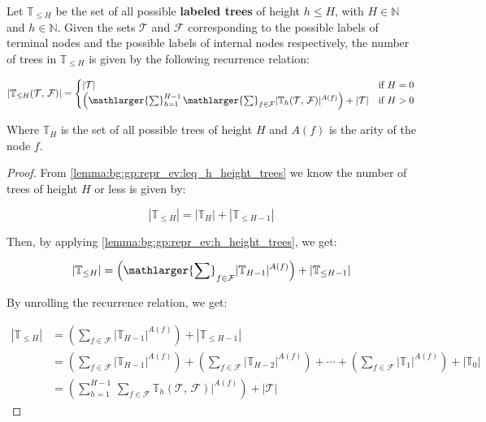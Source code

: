   \begin{theorem}
  \label{thm:bg:gp:repr_ev:leq_h_height_trees}
    Let \(\mathbb{T}_{\leq H}\) be the set of all possible \textbf{labeled 
    trees} of height \(h \leq H\), with \(H \in \mathbb{N}\) and \(h \in 
    \mathbb{N}\).
    Given the sets \(\mathcal{T}\) and \(\mathcal{F}\) corresponding to the
    possible labels of terminal nodes and the possible labels of internal nodes 
    respectively, the number of trees in \(\mathbb{T}_{\leq H}\) is given by the
    following recurrence relation:

    \begin{equation}
      |\mathbb{T}_{\leq H}(\mathcal{T},\, \mathcal{F})| = \begin{cases}
        |\mathcal{T}| 
          & \text{if } H = 0 \\
        \left(\mathlarger{\sum}_{h = 1}^{H - 1}\,
          \mathlarger{\sum}_{f \in \mathcal{F}} 
            |\mathbb{T}_{h}(\mathcal{T},\, \mathcal{F})|^{A(f)}\right)
          + |\mathcal{T}|
          & \text{if } H > 0
      \end{cases}
    \end{equation}

    Where \(\mathbb{T}_{H}\) is the set of all possible trees of height \(H\) 
    and \(A(f)\) is the arity of the node \(f\).
  \end{theorem}

  \begin{proof}
    From \vref{lemma:bg:gp:repr_ev:leq_h_height_trees} we
    know the number of trees of height \(H\) or less is given by:

    \[
      |\mathbb{T}_{\leq H}| = |\mathbb{T}_{H}| + |\mathbb{T}_{\leq H - 1}|
    \]

    Then, by applying 
    \vref{lemma:bg:gp:repr_ev:h_height_trees}, we get:

    \[
      |\mathbb{T}_{\leq H}| = \left(\mathlarger{\sum}_{f \in \mathcal{F}} 
        |\mathbb{T}_{H - 1}|^{A(f)}\right) + |\mathbb{T}_{\leq H - 1}|
    \]

    By unrolling the recurrence relation, we get:

    \begin{align*}
      |\mathbb{T}_{\leq H}| 
        &= \left(
            \sum_{f \in \mathcal{F}} |\mathbb{T}_{H - 1}|^{A(f)}
          \right) + |\mathbb{T}_{\leq H - 1}| \\
        &= \left(
            \sum_{f \in \mathcal{F}} |\mathbb{T}_{H - 1}|^{A(f)}
          \right) + \left(
            \sum_{f \in \mathcal{F}} |\mathbb{T}_{H - 2}|^{A(f)}
          \right) + \cdots + \left(
            \sum_{f \in \mathcal{F}} |\mathbb{T}_{1}|^{A(f)}
          \right) + |\mathbb{T}_{0}| \\
        &= \left(
          \sum_{h = 1}^{H - 1}\,
            \sum_{f \in \mathcal{F}} 
              \mathbb{T}_{h}(\mathcal{T},\, \mathcal{F})|^{A(f)}
          \right) + |\mathcal{T}|
    \end{align*}
  \end{proof}

